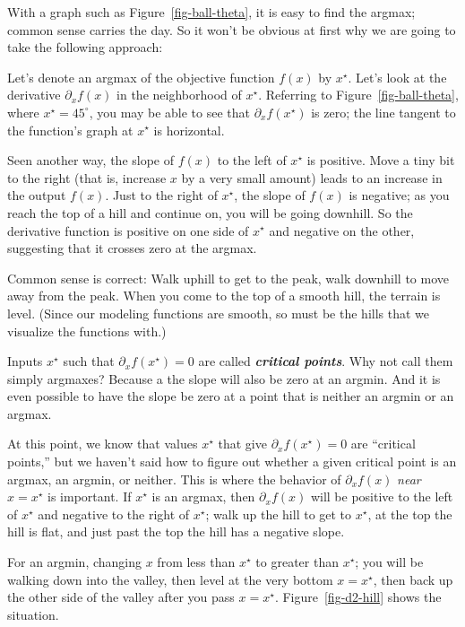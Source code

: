 \documentclass[
  letterpaper,
  DIV=11,
  numbers=noendperiod,
  oneside]{scrreprt}
\begin{document}
With a graph such as Figure~\ref{fig-ball-theta}, it is easy to find the
argmax; common sense carries the day. So it won't be obvious at first
why we are going to take the following approach:

Let's denote an argmax of the objective function \(f(x)\) by
\(x^\star\). Let's look at the derivative \(\partial_x f(x)\) in the
neighborhood of \(x^\star\). Referring to Figure~\ref{fig-ball-theta},
where \(x^\star = 45^\circ\), you may be able to see that
\(\partial_x f(x^\star)\) is zero; the line tangent to the function's
graph at \(x^\star\) is horizontal.

Seen another way, the slope of \(f(x)\) to the left of \(x^\star\) is
positive. Move a tiny bit to the right (that is, increase \(x\) by a
very small amount) leads to an increase in the output \(f(x)\). Just to
the right of \(x^\star\), the slope of \(f(x)\) is negative; as you
reach the top of a hill and continue on, you will be going downhill. So
the derivative function is positive on one side of \(x^\star\) and
negative on the other, suggesting that it crosses zero at the argmax.

Common sense is correct: Walk uphill to get to the peak, walk downhill
to move away from the peak. When you come to the top of a smooth hill,
the terrain is level. (Since our modeling functions are smooth, so must
be the hills that we visualize the functions with.)

Inputs \(x^\star\) such that \(\partial_x f(x^\star) = 0\) are called
\textbf{\emph{critical points}}. Why not call them simply argmaxes?
Because a the slope will also be zero at an argmin. And it is even
possible to have the slope be zero at a point that is neither an argmin
or an argmax.

At this point, we know that values \(x^\star\) that give
\(\partial_x f(x^\star) = 0\) are ``critical points,'' but we haven't
said how to figure out whether a given critical point is an argmax, an
argmin, or neither. This is where the behavior of \(\partial_x f(x)\)
\emph{near} \(x=x^\star\) is important. If \(x^\star\) is an argmax,
then \(\partial_x f(x)\) will be positive to the left of \(x^\star\) and
negative to the right of \(x^\star\); walk up the hill to get to
\(x^\star\), at the top the hill is flat, and just past the top the hill
has a negative slope.

For an argmin, changing \(x\) from less than \(x^\star\) to greater than
\(x^\star\); you will be walking down into the valley, then level at the
very bottom \(x=x^\star\), then back up the other side of the valley
after you pass \(x=x^\star\). Figure~\ref{fig-d2-hill} shows the
situation.
\end{document}
